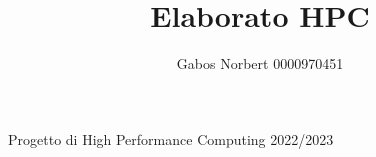 \documentclass[a4paper,12pt, oneside]{article}
\title{Elaborato HPC}
\author{Gabos Norbert 0000970451}
\begin{document}
\maketitle
Progetto di High Performance Computing 2022/2023
\end{document}

